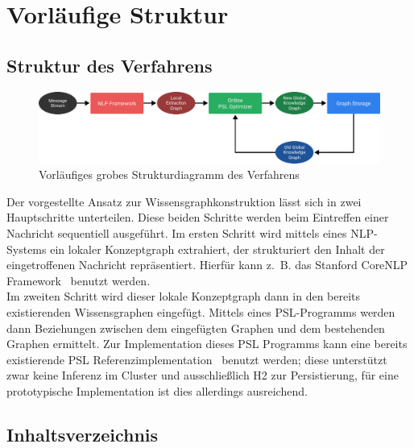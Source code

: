 \documentclass[11pt, a4paper]{scrreprt}
\begin{document}
\section{Vorläufige Struktur}

\subsection{Struktur des Verfahrens}

\begin{figure}[h]
	\centering
	\includegraphics[width=\linewidth]{assets/overview}
	\caption{Vorläufiges grobes Strukturdiagramm des Verfahrens}\label{fig:overview}
\end{figure}

Der vorgestellte Ansatz zur Wissensgraphkonstruktion lässt sich in zwei Hauptschritte unterteilen.
Diese beiden Schritte werden beim Eintreffen einer Nachricht sequentiell ausgeführt.
Im ersten Schritt wird mittels eines NLP-Systems ein lokaler Konzeptgraph extrahiert, der strukturiert den Inhalt der eingetroffenen Nachricht repräsentiert.
Hierfür kann z.~B. das Stanford CoreNLP Framework~\cite{corenlp:online} benutzt werden.\\

Im zweiten Schritt wird dieser lokale Konzeptgraph dann in den bereits existierenden Wissensgraphen eingefügt.
Mittels eines PSL-Programms werden dann Beziehungen zwischen dem eingefügten Graphen und dem bestehenden Graphen ermittelt.
Zur Implementation dieses PSL Programms kann eine bereits existierende PSL Referenzimplementation~\cite{psl:online} benutzt werden;
diese unterstützt zwar keine Inferenz im Cluster und ausschließlich H2 zur Persistierung, für eine prototypische Implementation ist dies allerdings ausreichend.

\subsection{Inhaltsverzeichnis}
\end{document}
